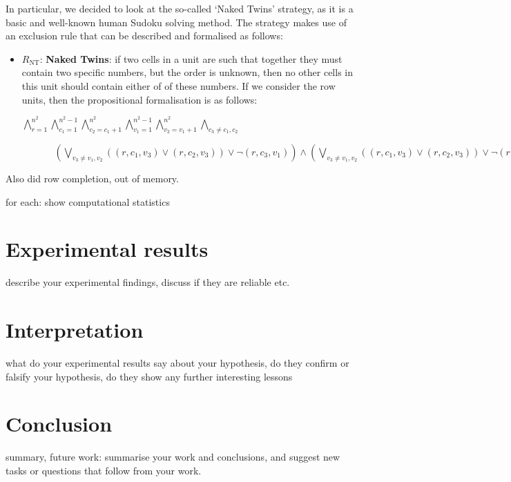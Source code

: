 \documentclass[10pt,a4paper,leqno]{article}
\newcommand{\lp}{\left(}
\newcommand{\rp}{\right)}
\begin{document}
In particular, we decided to look at the so-called `Naked Twins' strategy, as it is a basic and well-known human Sudoku solving method. The strategy makes use of an exclusion rule that can be described and formalised as follows:

\begin{itemize}

\item $ R_{\text{NT}}$: \textbf{Naked Twins}: if two cells in a unit are such that together they must contain two specific numbers, but the order is unknown, then no other cells in this unit should contain either of of these numbers. If we consider the row units, then the propositional formalisation is as follows: 
 
$\bigwedge_{r=1}^{n^2} \bigwedge_{c_1=1}^{n^2-1}\bigwedge_{c_2=c_1 + 1}^{n^2} \bigwedge_{v_1=1}^{n^2 - 1} \bigwedge_{v_2=v_1 + 1}^{n^2} \bigwedge_{c_3 \neq c_1,c_2} $

$\;\;\;\;\;\;\;\;\;\;\;\; \lp \bigvee_{v_3 \neq v_1,v_2} \lp (r,c_1,v_3) \lor (r,c_2,v_3)\rp \lor \neg (r,c_3,v_1) \rp 
\wedge
\lp \bigvee_{v_3 \neq v_1,v_2} \lp (r,c_1,v_3) \lor (r,c_2,v_3)\rp \lor \neg (r,c_3,v_2) \rp 
$


\end{itemize}






Also did row completion, out of memory. 



for each: show computational statistics 
 
 
 
 
\section*{Experimental results}

 describe your experimental findings, discuss if they are reliable etc.

\section*{Interpretation}

 what do your experimental results say about your hypothesis, do they confirm or falsify your hypothesis, do they show any further interesting lessons


\section*{Conclusion} summary, future work: summarise your work and conclusions, and suggest new tasks or questions that follow from your work. 
\end{document}
